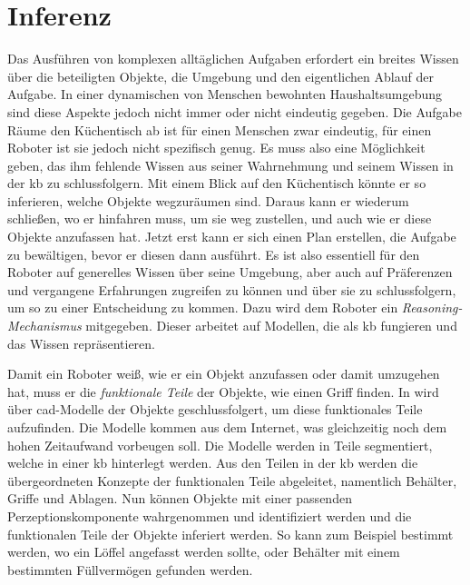 \section{Inferenz}

Das Ausführen von komplexen alltäglichen Aufgaben erfordert ein breites Wissen über die beteiligten Objekte, die Umgebung und den eigentlichen Ablauf der Aufgabe. In einer dynamischen von Menschen bewohnten Haushaltsumgebung sind diese Aspekte jedoch nicht immer oder nicht eindeutig gegeben. Die Aufgabe \glqq Räume den Küchentisch ab\grqq \xspace ist für einen Menschen zwar eindeutig, für einen Roboter ist sie jedoch nicht spezifisch genug. Es muss also eine Möglichkeit geben, das ihm fehlende Wissen aus seiner Wahrnehmung und seinem  Wissen in der \gls{kb} zu schlussfolgern. Mit einem Blick auf den Küchentisch könnte er so inferieren, welche Objekte wegzuräumen sind. Daraus kann er wiederum schließen, wo er hinfahren muss, um sie weg zustellen, und auch wie er diese Objekte anzufassen hat. Jetzt erst kann er sich einen Plan erstellen, die Aufgabe zu bewältigen, bevor er diesen dann ausführt. Es ist also essentiell für den Roboter auf generelles Wissen über seine Umgebung, aber auch auf Präferenzen und vergangene Erfahrungen zugreifen zu können und über sie zu schlussfolgern, um so zu einer Entscheidung zu kommen. Dazu wird dem Roboter ein \textit{Reasoning-Mechanismus} mitgegeben. Dieser arbeitet auf Modellen, die als \gls{kb} fungieren und das Wissen repräsentieren. \cite{Tenorth2010}    \par

Damit ein Roboter weiß, wie er ein Objekt anzufassen oder damit umzugehen hat, muss er die \textit{funktionale Teile} der Objekte, wie einen Griff finden. In \cite{reasoningFuncParts} wird über \gls{cad}-Modelle der Objekte geschlussfolgert, um diese funktionales Teile aufzufinden. Die Modelle kommen aus dem Internet, was gleichzeitig noch dem hohen Zeitaufwand vorbeugen soll. Die Modelle werden in Teile segmentiert, welche in einer \gls{kb} hinterlegt werden. Aus den Teilen in der \gls{kb} werden die übergeordneten Konzepte der funktionalen Teile abgeleitet, namentlich Behälter, Griffe und Ablagen. Nun können Objekte mit einer passenden Perzeptionskomponente wahrgenommen und identifiziert werden und die funktionalen Teile der Objekte inferiert werden. So kann zum Beispiel bestimmt werden, wo ein Löffel angefasst werden sollte, oder Behälter mit einem bestimmten Füllvermögen gefunden werden. \par

